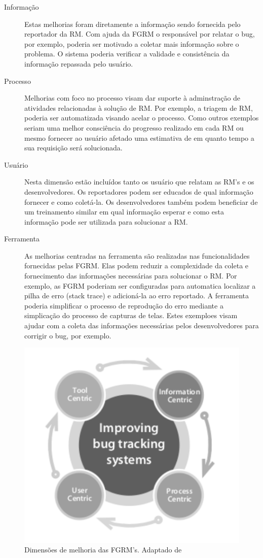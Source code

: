 \begin{description}
	\item[Informação] Estas melhorias foram diretamente a informação sendo fornecida pelo reportador
					  da RM. Com ajuda da FGRM o responsável por relatar o bug, por exemplo, poderia ser motivado a
					  coletar mais informação sobre o problema. O sistema poderia verificar a validade e consistência da
					  informação repassada pelo usuário.  
	\item[Processo]	  Melhorias com foco no processo visam dar suporte à adminstração de
					  atividades relacionadas à solução de RM. Por exemplo, a triagem de RM, poderia ser automatizada
					  visando acelar o processo. Como outros exemplos seriam uma melhor consciência do progresso realizado
					  em cada RM ou mesmo fornecer ao usuário afetado uma estimativa de em quanto tempo a sua requisição
					  será solucionada.
	\item[Usuário]    Nesta dimensão estão incluídos tanto os usuário que relatam as RM's e os
				      desenvolvedores. Os reportadores podem ser educados de qual informação fornecer e como
				      coletá-la. Os desenvolvedores também podem beneficiar de um treinamento similar em qual informação
					  esperar e como esta informação pode ser utilizada para solucionar a RM.
	\item[Ferramenta] As melhorias centradas na ferramenta são realizadas nas funcionalidades
					  fornecidas pelas FGRM. Elas podem reduzir a complexidade da coleta e fornecimento das
					  informações necessárias para solucionar o RM. Por exemplo, as FGRM poderiam ser configuradas
					  para automatica localizar a pilha de erro (stack trace) e adicioná-la ao erro reportado. A
					  ferramenta poderia simplificar o processo de reprodução do erro mediante a simplicação do
					  processo de capturas de telas. Estes exemploes visam ajudar com a coleta das informações
					  necessárias pelos desenvolvedores para corrigir o bug, por exemplo. 
\end{description}

\begin{figure}[htpb]
	\centering
	\includegraphics[width=0.666666\linewidth]{chapter-intro/img/dimensoes_melhorias_fgrm.pdf}
	\caption{Dimensões de melhoria das FGRM's. Adaptado de~\cite{zimmermann2005mining}}
	\label{fig:dimensoes_melhorias_fgrm}
\end{figure}

